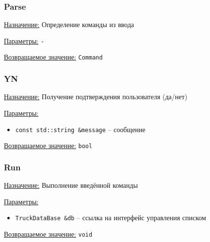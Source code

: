 \subsubsection*{Parse}

\underline{Назначение:} Определение команды из ввода

\underline{Параметры:} \verb|-|

\underline{Возвращаемое значение:} \verb|Command|


\subsubsection*{YN}

\underline{Назначение:} Получение подтверждения пользователя (да/нет)

\underline{Параметры:} 

\begin{itemize}
    \item \verb|const std::string &message| -- сообщение
\end{itemize}

\underline{Возвращаемое значение:} \verb|bool|


\subsubsection*{Run}

\underline{Назначение:} Выполнение введённой команды

\underline{Параметры:} 

\begin{itemize}
    \item \verb|TruckDataBase &db| -- ссылка на интерфейс управления списком
\end{itemize}

\underline{Возвращаемое значение:} \verb|void| 